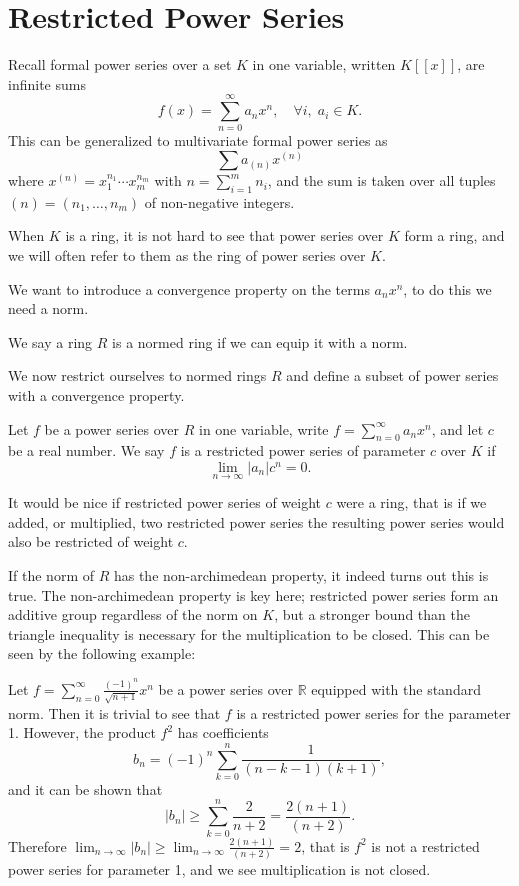\chapter{Restricted Power Series}

Recall formal power series over a set $K$ in one variable, written $K [ \! [ x ] \! ] $, are
infinite sums
\[
f(x) = \sum_{n=0}^\infty a_n x^n, \quad \forall i, \; a_i \in K.
\]
This can be generalized to multivariate formal power series as
\[
\sum a_{(n)} x^{(n)}
\]
where $x^{(n)} = x_1^{n_1} \cdots x_m^{n_m}$ with $n = \sum_{i = 1}^m n_i$, and the sum is taken
over all tuples $(n) = (n_1,\dots,n_m)$ of non-negative integers.

When $K$ is a ring, it is not hard to see that power series over $K$ form a ring, and we will often
refer to them as the ring of power series over $K$.

We want to introduce a convergence property on the terms $a_n x^n$, to do this we need a norm.

\begin{definition}
    We say a ring $R$ is a normed ring if we can equip it with a norm.
\end{definition}

We now restrict ourselves to normed rings $R$ and define a subset of power series with a convergence
property.

\begin{definition}
    \leanok
    Let $f$ be a power series over $R$ in one variable, write $f = \sum_{n=0}^\infty a_n x^n$, and
    let $c$ be a real number. We say $f$ is a restricted power series of parameter $c$ over $K$ if
    \[
    \lim_{n \to \infty} \lvert a_n \rvert c^n = 0.
    \]
\end{definition}

It would be nice if restricted power series of weight $c$ were a ring, that is if we added, or
multiplied, two restricted power series the resulting power series would also be restricted of
weight $c$.

If the norm of $R$ has the non-archimedean property, it indeed turns out this is true.
The non-archimedean property is key here; restricted power series form an additive group regardless
of the norm on $K$, but a stronger bound than the triangle inequality is necessary for the
multiplication to be closed. This can be seen by the following example:

\begin{example}

Let $f = \sum_{n=0}^\infty \frac{(-1)^n}{\sqrt{n+1}}x^n$ be a power series over $\mathbb{R}$
equipped with the standard norm. Then it is trivial to see that $f$ is a restricted power series for
the parameter 1. However, the product $f^2$ has coefficients
\[
b_n = (-1)^n \sum_{k=0}^n \frac{1}{(n - k -1)(k+1)},
\]
and it can be shown that
\[
\lvert b_n\rvert \geq \sum_{k = 0}^n \frac{2}{n + 2} = \frac{2 (n + 1)}{(n + 2)}.
\]
Therefore $\lim_{n \to \infty} \lvert b_n \rvert \geq \lim_{n \to \infty} \frac{2(n+1)}{(n+2)}=2$,
that is $f^2$ is not a restricted power series for parameter 1, and we see multiplication is not
closed.

\end{example}

